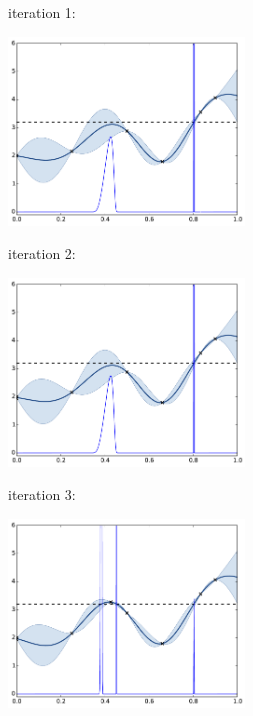 \documentclass{beamer}
\begin{document}
\begin{frame}[noframenumbering]{}
iteration 1: 
\begin{center}
\includegraphics[height=5cm]{figures/python/invproba1}
\end{center}
\end{frame}

\begin{frame}[noframenumbering]{}
iteration 2: 
\begin{center}
\includegraphics[height=5cm]{figures/python/invproba2}
\end{center}
\end{frame}

\begin{frame}[noframenumbering]{}
iteration 3: 
\begin{center}
\includegraphics[height=5cm]{figures/python/invproba3}
\end{center}
\end{frame}
\end{document}
